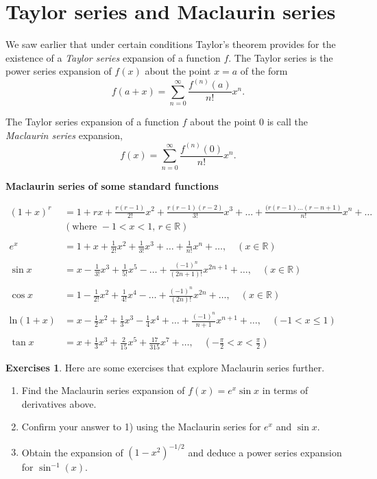 \documentclass[extrafontsizes, twoside, a4paper]{memoir}
\theoremstyle{plain}%
\theoremstyle{definition}
\newtheorem{exer}{Exercises}[chapter]
\theoremstyle{remark}
\begin{document}
\section{Taylor series and Maclaurin series}
We saw earlier that under certain conditions Taylor's theorem provides for the existence of a \textit{Taylor series} expansion of a function $f$. The Taylor series is the power series expansion of $f(x)$ about the point $x=a$ of the form
$$f(a+x) = \sum_{n=0}^\infty \frac{f^{(n)}(a)}{n!} x^n .$$

The Taylor series expansion of a function $f$ about the point $0$ is call the \textit{Maclaurin series} expansion,
$$f(x) = \sum_{n=0}^\infty \frac{f^{(n)}(0)}{n!} x^n .$$

\noindent
\hrulefill

\begin{center}
\textbf{Maclaurin series of some standard functions}
\end{center}

\begin{align*}
(1+x)^r &= 1 + rx + \frac{r(r-1)}{2!}x^2 + \frac{r(r-1)(r-2)}{3!}x^3 + \dots + \frac{(r(r-1)\dots (r-n+1)}{n!}x^n + \dots \\
& (\text{where }-1 < x < 1, \, r \in \mathbb{R}) \\
\\
e^x &= 1 + x + \frac{1}{2!}x^2 + \frac{1}{3!}x^3 + \dots + \frac{1}{n!} x^n + \dots , \quad (x \in \mathbb{R}) \\
\\
\sin{x} &= x - \frac{1}{3!} x^3 + \frac{1}{5!} x^5 - \dots + \frac{(-1)^n}{(2n+1)!} x^{2n+1} + \dots , \quad (x \in \mathbb{R}) \\
\\
\cos{x} &= 1 - \frac{1}{2!} x^2 + \frac{1}{4!} x^4 - \dots + \frac{(-1)^n}{(2n)!} x^{2n}  + \dots , \quad (x \in \mathbb{R}) \\
\\
\text{ln} (1+x) & = x - \frac{1}{2} x^2 + \frac{1}{3} x^3 - \frac{1}{4} x^4 + \dots + \frac{(-1)^n}{n+1} x^{n+1} + \dots , \quad (-1 < x \leq 1) \\
\\
\tan{x} &= x + \frac{1}{3} x^3 + \frac{2}{15} x^5 + \frac{17}{315} x^7 + \dots , \quad (-\frac{\pi}{2} < x < \frac{\pi}{2} )
\end{align*}

\noindent
\hrulefill
\begin{exer}
Here are some exercises that explore Maclaurin series further.
\begin{enumerate}
\item
Find the Maclaurin series expansion of $f(x)=e^x \sin{x}$ in terms of derivatives above.
\item
Confirm your answer to 1) using the Maclaurin series for $e^x$ and $\sin{x}$.
\item
Obtain the expansion of $(1-x^2)^{-1/2}$ and deduce a power series expansion for $\sin^{-1} (x)$.
\end{enumerate}
\end{exer}
\end{document}
